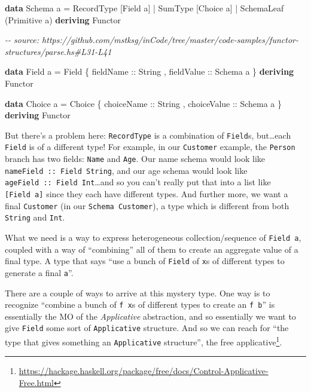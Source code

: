 \documentclass[]{article}
\newenvironment{Shaded}{}{}
\newcommand{\CommentTok}[1]{\textcolor[rgb]{0.38,0.63,0.69}{\textit{#1}}}
\newcommand{\DataTypeTok}[1]{\textcolor[rgb]{0.56,0.13,0.00}{#1}}
\newcommand{\KeywordTok}[1]{\textcolor[rgb]{0.00,0.44,0.13}{\textbf{#1}}}
\newcommand{\NormalTok}[1]{#1}
\newcommand{\OperatorTok}[1]{\textcolor[rgb]{0.40,0.40,0.40}{#1}}
\newcommand{\OtherTok}[1]{\textcolor[rgb]{0.00,0.44,0.13}{#1}}
\renewcommand{\href}[2]{#2\footnote{\url{#1}}}
\begin{document}
\begin{Shaded}
\begin{Highlighting}[]
\KeywordTok{data} \DataTypeTok{Schema}\NormalTok{ a }\OtherTok{=}
      \DataTypeTok{RecordType}\NormalTok{  [}\DataTypeTok{Field}\NormalTok{ a]}
    \OperatorTok{|} \DataTypeTok{SumType}\NormalTok{     [}\DataTypeTok{Choice}\NormalTok{ a]}
    \OperatorTok{|} \DataTypeTok{SchemaLeaf}\NormalTok{  (}\DataTypeTok{Primitive}\NormalTok{ a)}
  \KeywordTok{deriving} \DataTypeTok{Functor}

\CommentTok{{-}{-} source: https://github.com/mstksg/inCode/tree/master/code{-}samples/functor{-}structures/parse.hs\#L31{-}L41}

\KeywordTok{data} \DataTypeTok{Field}\NormalTok{ a }\OtherTok{=} \DataTypeTok{Field}
\NormalTok{    \{}\OtherTok{ fieldName  ::} \DataTypeTok{String}
\NormalTok{    ,}\OtherTok{ fieldValue ::} \DataTypeTok{Schema}\NormalTok{ a}
\NormalTok{    \}}
  \KeywordTok{deriving} \DataTypeTok{Functor}

\KeywordTok{data} \DataTypeTok{Choice}\NormalTok{ a }\OtherTok{=} \DataTypeTok{Choice}
\NormalTok{    \{}\OtherTok{ choiceName  ::} \DataTypeTok{String}
\NormalTok{    ,}\OtherTok{ choiceValue ::} \DataTypeTok{Schema}\NormalTok{ a}
\NormalTok{    \}}
  \KeywordTok{deriving} \DataTypeTok{Functor}
\end{Highlighting}
\end{Shaded}

But there's a problem here: \texttt{RecordType} is a combination of
\texttt{Field}s, but\ldots each \texttt{Field} is of a different type! For
example, in our \texttt{Customer} example, the \texttt{Person} branch has two
fields: \texttt{Name} and \texttt{Age}. Our name schema would look like
\texttt{nameField\ ::\ Field\ String}, and our age schema would look like
\texttt{ageField\ ::\ Field\ Int}\ldots and so you can't really put that into a
list like \texttt{{[}Field\ a{]}} since they each have different types. And
further more, we want a final \texttt{Customer} (in our
\texttt{Schema\ Customer}), a type which is different from both \texttt{String}
and \texttt{Int}.

What we need is a way to express heterogeneous collection/sequence of
\texttt{Field\ a}, coupled with a way of ``combining'' all of them to create an
aggregate value of a final type. A type that says ``use a bunch of
\texttt{Field} of \texttt{x}s of different types to generate a final
\texttt{a}''.

There are a couple of ways to arrive at this mystery type. One way is to
recognize ``combine a bunch of \texttt{f\ x}s of different types to create an
\texttt{f\ b}'' is essentially the MO of the \emph{Applicative} abstraction, and
so essentially we want to give \texttt{Field} some sort of \texttt{Applicative}
structure. And so we can reach for ``the type that gives something an
\texttt{Applicative} structure'', the
\href{https://hackage.haskell.org/package/free/docs/Control-Applicative-Free.html}{free
applicative}.
\end{document}

